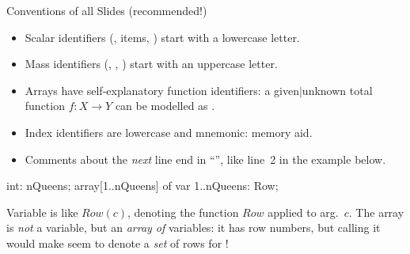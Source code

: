 \documentclass{cons-beamer}
\begin{document}
\begin{flashcardminizinc}
\begin{frame}[fragile]{Conventions of all Slides (recommended!)}
  \begin{itemize}
  \item Scalar identifiers (,  items,
    ) start with a lowercase letter. \vfill
  \item Mass identifiers (, ,
    ) start with an uppercase letter. 
  \item Arrays have self-explanatory function identifiers: a
    given$\mid$unknown total function $f \colon X \to Y$ can be
    modelled as . 
  \item Index identifiers are lowercase and mnemonic: memory aid. 
  \item Comments about the \emph{next} line end in ``\mzninline{:}'',
    like line~2 in the example below.
  \end{itemize}
  \begin{example}
    \vspace{-3mm}
    \footnotesize
    \begin{mzn}
int: nQueens; %
array[1..nQueens] of var 1..nQueens: Row;
    \end{mzn}\normalsize\vspace{-2mm}
    Variable  is like $\mathit{Row}(c)$, denoting
    the function $\mathit{Row}$ applied to arg.~$c$.
    The array  is \emph{not} a variable, but an
    \emph{array of} variables: it has row numbers, but calling it
     would make  seem to denote a
    \emph{set} of rows for !
  \end{example}
\end{frame}


\end{flashcardminizinc}
\end{document}
